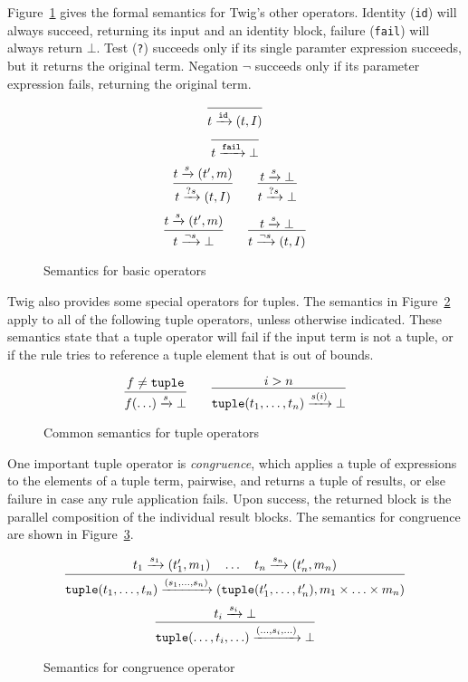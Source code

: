 Figure~\ref{fig:basic} gives the formal semantics for Twig's other operators. Identity (\texttt{id}) will always succeed, returning its input and an identity block, failure (\texttt{fail}) will always return \texttt{$\bot$}. Test (\texttt{?}) succeeds only if its single paramter expression succeeds, but it returns the original term. Negation \texttt{$\lnot$} succeeds only if its parameter expression fails, returning the original term.

\begin{figure}[ht]
\label{fig:basic}
\[
\infer
  {t \arr{\mathtt{id}} (t,I)}
  {}
\]
\[
\infer
  {t \arr{\mathtt{fail}} \bot}
  {}
\]
\[
\infer
  {t \arr{?s} (t,I)}
  {t \arr{s} (t',m)}
\qquad 
\infer
  {t \arr{?s} \bot}
  {t \arr{s} \bot}
\]
\[
\infer
  {t \arr{\lnot s} \bot}
  {t \arr{s} (t',m)}
\qquad 
\infer
  {t \arr{\lnot s} (t,I)}
  {t \arr{s} \bot}
\]
\caption{Semantics for basic operators}
\end{figure}

Twig also provides some special operators for tuples. The semantics in Figure~\ref{fig:all-tuples} apply to all of the following tuple operators, unless otherwise indicated. These semantics state that a tuple operator will fail if the input term is not a tuple, or if the rule tries to reference a tuple element that is out of bounds.

\begin{figure}[ht]
\label{fig:all-tuples}
\[
\infer
  {f(\ldots) \arr{s} \bot}
  {f \neq \mathtt{tuple}}
\qquad
\infer
  {\mathtt{tuple}(t_1,\ldots,t_n) \arr{s(i)} \bot}
  {i > n}
\]
\caption{Common semantics for tuple operators}
\end{figure}

One important tuple operator is \emph{congruence}, which applies a tuple of expressions to the elements of a tuple term, pairwise, and returns a tuple of results, or else failure in case any rule application fails. Upon success, the returned block is the parallel composition of the individual result blocks. The semantics for congruence are shown in Figure~\ref{fig:congruence}.

\begin{figure}[ht]
\label{fig:congruence}
\[
\infer
  {\mathtt{tuple}(t_1,\ldots,t_n)\arr{(s_1,\ldots,s_n)} (\mathtt{tuple}(t_1',\ldots,t_n'),m_1 \times \ldots \times m_n) }
  {t_1 \arr{s_1} (t_1',m_1) \quad \ldots \quad t_n \arr{s_n} (t_n',m_n)}
\]
\[
\infer
  {\mathtt{tuple}(\ldots,t_i,\ldots)\arr{(\ldots,s_i,\ldots)}\bot}
  {t_i \arr{s_i} \bot}
\]
\caption{Semantics for congruence operator}
\end{figure}


